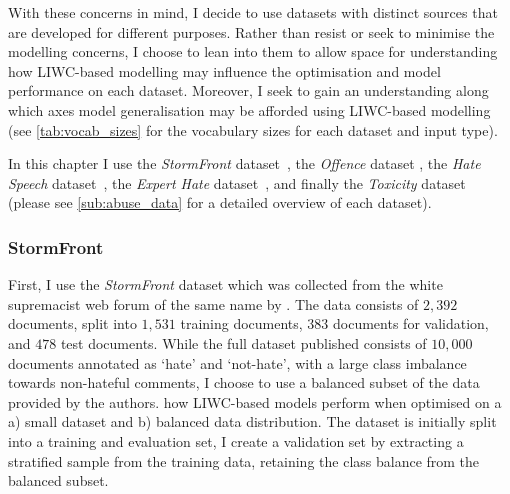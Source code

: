 With these concerns in mind, I decide to use datasets with distinct sources that are developed for different purposes.  
Rather than resist or seek to minimise the modelling concerns, I choose to lean into them to allow space for understanding how LIWC-based modelling may influence the optimisation and model performance on each dataset.  
Moreover, I seek to gain an understanding along which axes model generalisation may be afforded using LIWC-based modelling (see \cref{tab:vocab_sizes} for the vocabulary sizes for each dataset and input type).  
  
In this chapter I use the \textit{StormFront} dataset~\citep{Garcia:2019}, the \textit{Offence} dataset \citep{Davidson:2017}, the \textit{Hate Speech} dataset~\citep{Waseem-Hovy:2016}, the \textit{Expert Hate} dataset~\citep{Waseem:2016}, and finally the \textit{Toxicity} dataset~\citep{Wulczyn:2017} (please see \cref{sub:abuse_data} for a detailed overview of each dataset).  
  
\subsubsection{StormFront}  
First, I use the \textit{StormFront} dataset which was collected from the white supremacist web forum of the same name by \citet{Garcia:2019}.  
The data consists of $2,392$ documents, split into $1,531$ training documents, $383$ documents for validation, and $478$ test documents.  
While the full dataset published consists of $10,000$ documents annotated as `hate' and `not-hate', with a large class imbalance towards non-hateful comments, I choose to use a balanced subset of the data provided by the authors.  
 how LIWC-based models perform when optimised on a a) small dataset and b) balanced data distribution.  
The dataset is initially split into a training and evaluation set, I  create a validation set by extracting a stratified sample from the training data, retaining the class balance from the balanced subset.  
  
